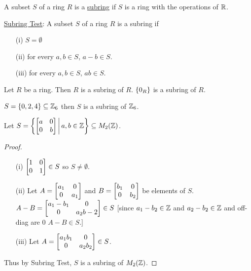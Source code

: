 \documentclass[]{article}
\begin{document}
\begin{definition}
	A subset $S$ of a ring $R$ is a \ul{subring} if $S$ is a ring with the operations of $\mathbb{R}$.
\end{definition}
\ul{Subring Test}: A subset $S$ of a ring $R$ is a subring if
\begin{itemize}
	\item[(i)] $S=\emptyset$
	\item[(ii)] for every $a,b\in S$, $a-b\in S$.
	\item[(iii)] for every $a,b\in S$, $ab\in S$.
\end{itemize}
\begin{example}
	Let $R$ be a ring. Then $R$ is a subring of $R$. $\left\{ 0_R \right\}$ is a subring of $R$.
\end{example}
\begin{example}
	$S = \left\{ 0,2,4 \right\}\subseteq\mathbb{Z}_6$ then $S$ is a subring of $\mathbb{Z}_6$.
\end{example}
\begin{example}
	Let $S=\left\{ \begin{bmatrix}a&0\\0&b\end{bmatrix} \, \middle| \, a,b\in\mathbb{Z} \right\}\subseteq M_2(\mathbb{Z})$.
\end{example}
\begin{proof}
	\begin{itemize}
		\item[(i)] $\begin{bmatrix}1&0\\0&1\end{bmatrix}\in S$ so $S\neq\emptyset$.
		\item[(ii)] Let $A=\begin{bmatrix}a_1&0\\0&a_1\end{bmatrix}$ and $B=\begin{bmatrix}b_1&0\\0&b_2\end{bmatrix}$ be elements of $S$. $A-B=\begin{bmatrix}a_1-b_1&0\\0&a_2b-2\end{bmatrix} \in S$ [since $a_1-b_2\in\mathbb{Z}$ and $a_2-b_2\in\mathbb{Z}$ and off-diag are 0 $A-B\in S$.]
		\item[(iii)] Let $A=\begin{bmatrix}a_1b_1&0\\0&a_2b_2\end{bmatrix}\in S$.
	\end{itemize}
	Thus by Subring Test, $S$ is a subring of $M_2(\mathbb{Z})$.
\end{proof}
\end{document}
